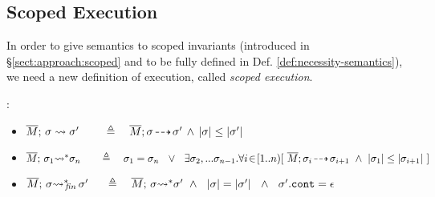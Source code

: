  
 \subsection{Scoped Execution}
 \label{sect:bounded}


In order to give semantics to scoped invariants (introduced in \S  \ref{sect:approach:scoped} and to be fully defined  in Def.  \ref{def:necessity-semantics}), we need a new definition of execution, called \emph{scoped execution}. 

 
 \renewcommand{\EarlierS}[2]{\DepthSt{#1} \leq \DepthSt{#2}}
 \renewcommand{\NotEarlierS}[2]{\DepthSt{#1} \not\leq \DepthSt{#2}} 
 
\begin{definition}:
\label{def:shallow:term}
 
\begin{itemize}

  \item
{  $\leadstoBounded  {\Mtwo} {\sigma}   {\sigma'} \ \ \   \,   \ \ \ \triangleq \ \ \  \leadstoOrig {\Mtwo} {\sigma} {\sigma'} \, \wedge\, 
 \EarlierS {\sigma}  {\sigma'} $}
  \item
{  $\leadstoBoundedStar {\Mtwo}  {\sigma_1}  {\sigma_n}  \ \ \,  \ \    \ \triangleq  \ \ \  {\sigma_1} = {\sigma_n}\ \ \vee \ \  \exists \sigma_2,...\sigma_{n-1}.\forall i\!\in\! [1..n)[\  \leadstoOrig {\Mtwo}  {\sigma_i}  {\sigma_{i+1}}\  \wedge\  \EarlierS{\sigma_1} {\sigma_{i+1}} \ ]$ }
\item
  $\leadstoBoundedStarFin {\Mtwo}  {\sigma}  {\sigma'}  \  \,  \ \  \ \triangleq  \ \ \  \leadstoBoundedStar {\Mtwo}  {\sigma}  {\sigma'}  \ \wedge\ \
 {\DepthFs \sigma = \DepthFs {\sigma'} \ \ \wedge \ \ \sigma'.\prg{cont}=\epsilon  } $
 \end{itemize}
\end{definition}


